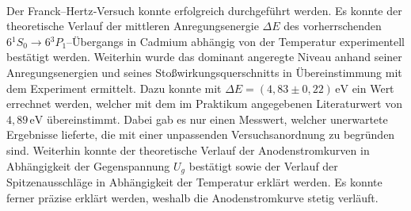 \vspace{0.3cm}\\
Der Franck–Hertz‐Versuch konnte erfolgreich durchgeführt werden. Es konnte der theoretische Verlauf der mittleren Anregungsenergie $\Delta E$ des vorherrschenden $6{}^1S_0 \to 6{}^3P_1$–Übergangs in Cadmium abhängig von der Temperatur experimentell bestätigt werden. Weiterhin wurde das dominant angeregte Niveau anhand seiner Anregungsenergien und seines Stoßwirkungsquerschnitts in Übereinstimmung mit dem Experiment ermittelt. Dazu konnte mit $\Delta E = (4{,}83 \pm 0{,}22)\,\mathrm{eV}$  ein Wert errechnet werden, welcher mit dem im Praktikum angegebenen Literaturwert von $4{,}89\,\mathrm{eV}$ übereinstimmt. Dabei gab es nur einen Messwert, welcher unerwartete Ergebnisse lieferte, die mit einer unpassenden Versuchsanordnung zu begründen sind. Weiterhin konnte der theoretische Verlauf der Anodenstromkurven in Abhängigkeit der Gegenspannung $U_g$ bestätigt sowie der Verlauf der Spitzenausschläge in Abhängigkeit der Temperatur erklärt werden. Es konnte ferner präzise erklärt werden, weshalb die Anodenstromkurve stetig verläuft.
